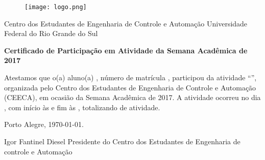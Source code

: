 \begin{landscape}
\centering
\begin{figure}
\centering
\texttt{[image: logo.png]}
\end{figure}
Centro dos Estudantes de Engenharia de Controle e Automação
Universidade Federal do Rio Grande do Sul

\textbf{Certificado de Participação em Atividade da Semana Acadêmica de 2017}

\justify
	Atestamos que o(a) aluno(a) \NOME{}, número de matrícula \NUMERO{}, participou da atividade “\ATIVIDADE{}”, organizada pelo Centro dos Estudantes de Engenharia de Controle e Automação (CEECA), em ocasião da Semana Acadêmica de 2017. A atividade ocorreu no dia \DIA{}, com início às \HINICIO{} e fim às \HFIM{}, totalizando \DURACAO{} de atividade.

\vspace{10mm}

\centering
Porto Alegre, \today.

\vspace{20mm}
Igor Fantinel Diesel\linebreak
Presidente do Centro dos Estudantes de Engenharia de controle e Automação
\end{landscape}
